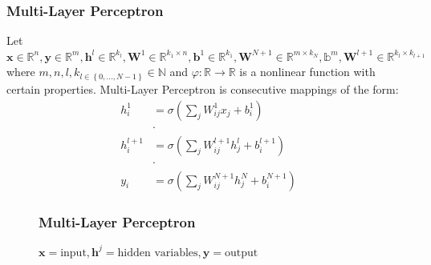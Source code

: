 \begin{frame}
\frametitle{Multi-Layer Perceptron}
\begin{Def}
Let $\boldsymbol{x} \in \mathbb{R}^n,\boldsymbol{y} \in \mathbb{R}^m, \boldsymbol{h}^l \in \mathbb{R}^{k_l}, \boldsymbol{W}^1 \in \mathbb{R}^{k_1 \times n}
, \boldsymbol{b}^1 \in \mathbb{R}^{k_1}, \boldsymbol{W}^{N+1} \in \mathbb{R}^{m \times k_N}, \mathbb{b}^m,\boldsymbol{W}^{l+1} \in \mathbb{R}^{k_l \times k_{l+1}}$ 
where $m,n,l,k_{l\in \left\{0,\ldots,N-1\right\}} \in \mathbb{N}$ and $\varphi \colon \mathbb{R} \to \mathbb{R}$ is a 
nonlinear function with certain properties. Multi-Layer Perceptron is consecutive mappings of the form:
\begin{equation}
\begin{split}
  h_i^{1}   &= \sigma \left( \sum_{j}^{} W_{ij}^{1}x_j + b_i^{1} \right)\\ 
          & \cdot\\
  h_i^{l+1} &= \sigma \left( \sum_{j}^{} W_{ij}^{l+1}h_j^l + b_i^{l+1} \right)\\
          & \cdot\\
  y_i^{}    &= \sigma \left( \sum_{j}^{} W_{ij}^{N+1}h_j^N + b_i^{N+1} \right)
\end{split}
\end{equation}
\end{Def}
\end{frame} 



\begin{frame}
\begin{figure}
  \frametitle{Multi-Layer Perceptron}
  \centering
  \resizebox{1.0\textwidth}{!}{}
  \caption{$\boldsymbol{x} =\text{input},\boldsymbol{h}^j=\text{hidden variables},\boldsymbol{y}=\text{output}$}
  \label{fig:multi_layer_perceptron}
\end{figure}
\end{frame} 










